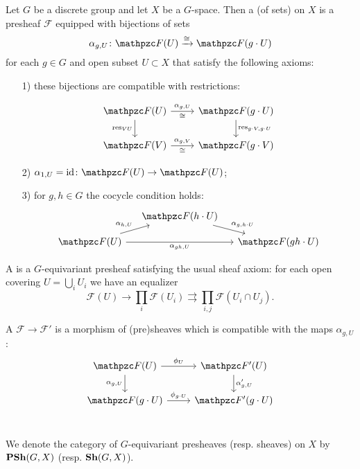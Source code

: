 \begin{definition}
  \label{dfn:equivariant-sheaves}
  Let $G$ be a discrete group and let $X$ be a $G$-space. Then a
   (of sets) on $X$ is a presheaf $\mathcal{F}$
  equipped with bijections of sets
  $$\alpha_{g,U}\colon \mathcal{F} (U) \xrightarrow{\isom} \mathcal{F} (g\cdot U)$$
  for each $g\in G$ and open subset $U\subset X$ that satisfy the following
  axioms:

  \begin{enumerate}
  \item[1)] these bijections are compatible with restrictions:

    \[ \begin{tikzcd}
      \mathcal{F} (U)\ar{r}{\alpha_{g,U}}[swap]{\isom}\ar{d}[swap]{\res_{VU}} & \mathcal{F} (g\cdot U)\ar{d}{\res_{g\cdot V,g\cdot U}} \\
      \mathcal{F} (V)\ar{r}{\alpha_{g,V}}[swap]{\isom} & \mathcal{F} (g\cdot V)
    \end{tikzcd} \]

  \item[2)] $\alpha_{1,U} = \idid\colon \mathcal{F} (U) \to \mathcal{F} (U)$;

  \item[3)] for $g,h\in G$ the cocycle condition holds:
    \[ \begin{tikzcd}[row sep=small, column sep=small]
        & \mathcal{F} (h\cdot U) \ar{dr}{\alpha_{g,h\cdot U}} \\
        \mathcal{F} (U)\ar{ur}{\alpha_{h,U}}\ar{rr}[swap]{\alpha_{gh,U}} & & \mathcal{F} (gh\cdot U)
    \end{tikzcd} \]
  \end{enumerate}

  A  is a $G$-equivariant presheaf satisfying the
  usual sheaf axiom: for each open covering $U = \bigcup_i U_i$ we have an
  equalizer
  \[ \mathcal{F} (U) \to \prod_i \mathcal{F} (U_i) \rightrightarrows
    \prod_{i,j} \mathcal{F} (U_i\cap U_j). \]

  A 
  $\mathcal{F} \to \mathcal{F}'$ is a morphism of (pre)sheaves which is
  compatible with the maps $\alpha_{g,U}$:
  \[ \begin{tikzcd}
      \mathcal{F} (U) \ar{r}{\phi_U}\ar{d}[swap]{\alpha_{g,U}} & \mathcal{F}' (U) \ar{d}{\alpha'_{g,U}} \\
      \mathcal{F} (g\cdot U) \ar{r}{\phi_{g\cdot U}} & \mathcal{F}' (g\cdot U) \\
    \end{tikzcd} \]

  We denote the category of $G$-equivariant presheaves (resp. sheaves) on $X$ by
  $\text{\bf PSh} (G,X)$ (resp. $\text{\bf Sh} (G,X)$).
\end{definition}

